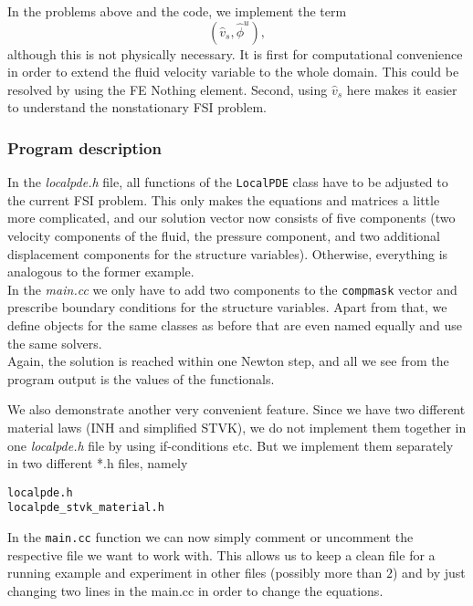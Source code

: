 \begin{remark}
In the problems above and the code, we implement the term
\[
(\hat v_s, \hat\phi^u),
\]
although this is not physically necessary. It is first for computational
convenience in order to extend the fluid velocity variable to the whole
domain.
This could be resolved by using the FE Nothing element. Second, 
using $\hat v_s$ here makes it easier to understand the 
nonstationary FSI problem.
\end{remark}

\subsubsection{Program description}

In the \textit{localpde.h} file, all functions of the \texttt{LocalPDE} class have to be adjusted to the current FSI problem. This only makes the equations and matrices a little more complicated, and our solution vector now consists of five components (two velocity components of the fluid, the pressure component, and two additional displacement components for the structure variables). Otherwise, everything is analogous to the former example.\\
In the \textit{main.cc} we only have to add two components to the \texttt{compmask} vector and prescribe boundary conditions for the structure variables. Apart from that, we define objects for the same classes as before that are even named equally and use the same solvers.\\ 
Again, the solution is reached within one Newton step, and all we see from the
program output is the values of the functionals.

We also demonstrate another very convenient feature. Since we have 
two different material laws (INH and simplified STVK), we do not implement 
them together in one \textit{localpde.h} file by using if-conditions etc. 
But we implement them separately in two different *.h files, namely
\begin{lstlisting}
localpde.h
localpde_stvk_material.h
\end{lstlisting}
In the \texttt{main.cc} function we can now simply comment 
or uncomment the respective file we want to work with.
This allows us to keep a clean file for a running example and experiment 
in other files (possibly more than $2$) and by just changing 
two lines in the main.cc in order to change the equations.
